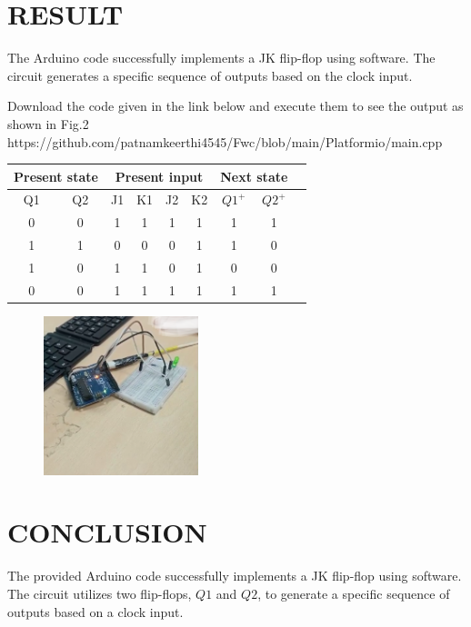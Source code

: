 \documentclass[conference]{IEEEtran}
\begin{document}
 \section{RESULT}
 The Arduino code successfully implements a JK flip-flop using software. The circuit generates a specific sequence of outputs based on the clock input.


 Download the code given in the link below and execute them to see the output as shown in Fig.2  \\
https://github.com/patnamkeerthi4545/Fwc/blob/main/Platformio/main.cpp


\begin{table}[ht]
\centering
\label{tab:connections}
\begin{tabular}{|c|c|c|c|c|c|c|c|c|}
\hline
\multicolumn{2}{|c|}{Present state} & \multicolumn{4}{c|}{Present input} & \multicolumn{2}{c|}{Next state} \\ \hline
	Q1 & Q2 & J1 & K1 & J2 & K2 & $Q1^{+}$ & $Q2^{+}$ \\ \hline
	0 & 0 & 1 & 1 & 1 & 1  & 1 & 1 \\ \hline
	1 & 1 & 0 & 0 & 0 & 1 &  1 & 0 \\ \hline
	1 & 0 & 1 & 1 & 0 & 1 & 0 & 0 \\ \hline
	0 & 0 & 1 & 1 & 1 & 1 & 1 & 1 \\ \hline
\end{tabular}
\end{table}

 \begin{figure}[h]
   \centering
   \includegraphics[width=0.4\textwidth]{fig.jpg}
   \caption{\label{fig:1}}
  \end{figure}

 \section{CONCLUSION}

The provided Arduino code successfully implements a JK flip-flop using software. The circuit utilizes two flip-flops, $Q1$ and $Q2$, to generate a specific sequence of outputs based on a clock input. 
\end{document}
